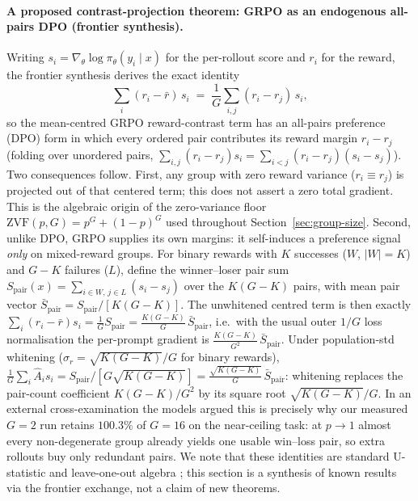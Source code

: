 \paragraph{A proposed contrast-projection theorem: GRPO as an endogenous all-pairs DPO (frontier synthesis).}
Writing $s_i = \nabla_\theta \log \pi_\theta(y_i \mid x)$ for the
per-rollout score and $r_i$ for the reward, the frontier synthesis
derives the exact identity
\begin{equation}
  \sum_{i}(r_i - \bar r)\, s_i \;=\; \frac{1}{G}\sum_{i,j}(r_i - r_j)\, s_i,
  \label{eq:fs-contrast}
\end{equation}
so the mean-centred GRPO reward-contrast term has an all-pairs preference
(DPO) form in which every ordered pair contributes its reward margin
$r_i-r_j$ (folding over unordered pairs,
$\sum_{i,j}(r_i-r_j)s_i=\sum_{i<j}(r_i-r_j)(s_i-s_j)$). Two consequences follow. First, any group with zero reward
variance ($r_i \equiv r_j$) is projected out of that centered term; this
does not assert a zero total gradient. This is the algebraic origin of the zero-variance floor
$\mathrm{ZVF}(p,G)=p^G+(1-p)^G$ used throughout
Section~\ref{sec:group-size}. Second, unlike DPO, GRPO supplies its own
margins: it self-induces a preference signal \emph{only} on
mixed-reward groups. For binary rewards with $K$ successes
($W$, $|W|{=}K$) and $G-K$ failures ($L$), define the
winner--loser pair sum
$S_\mathrm{pair}(x)=\sum_{i\in W,\,j\in L}(s_i-s_j)$ over the
$K(G-K)$ pairs, with mean pair vector
$\bar S_\mathrm{pair}=S_\mathrm{pair}/[K(G-K)]$. The unwhitened
centred term is then exactly
$\sum_i(r_i-\bar r)s_i=\tfrac1G S_\mathrm{pair}
=\tfrac{K(G-K)}{G}\,\bar S_\mathrm{pair}$, i.e.\ with the usual
outer $1/G$ loss normalisation the per-prompt gradient is
$\tfrac{K(G-K)}{G^2}\,\bar S_\mathrm{pair}$. Under population-std
whitening ($\sigma_r=\sqrt{K(G-K)}/G$ for binary rewards),
$\tfrac1G\sum_i\hat A_i s_i
=S_\mathrm{pair}/[G\sqrt{K(G-K)}]
=\tfrac{\sqrt{K(G-K)}}{G}\,\bar S_\mathrm{pair}$: whitening
replaces the pair-count coefficient $K(G-K)/G^2$ by its square
root $\sqrt{K(G-K)}/G$. In an external
cross-examination the models argued this is precisely why our measured
$G{=}2$ run retains $100.3\%$ of $G{=}16$ on the near-ceiling task: at
$p\!\to\!1$ almost every non-degenerate group already yields one usable
win--loss pair, so extra rollouts buy only redundant pairs. We note that these
identities are standard U-statistic and leave-one-out algebra
\citep{ahmadian2024backtobasics}; this section is a synthesis of
known results via the frontier exchange, not a claim of new
theorems.


